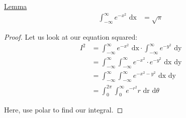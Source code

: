 \documentclass{article}
\begin{document}
\underline{Lemma}
%
\begin{align}
  \int^\infty_{-\infty} e^{-x^2} \text{ dx} & = \sqrt \pi
\end{align}

\begin{proof}
  Let us look at our equation squared:
  \begin{align}
    I^2 & =
    \int^\infty_{-\infty} e^{-x^2} \text{ dx} \cdot
    \int^\infty_{-\infty} e^{-y^2} \text{ dy}\\
    & = \int^\infty_{-\infty} \int^\infty_{-\infty}
    e^{-x^2} \cdot e^{-y^2} \text{ dx dy}\\
    & =
    \int^\infty_{-\infty} \int^\infty_{-\infty}
    e^{-x^2 - y^2} \text{ dx dy}\\
    & =
    \int^{2 \pi}_{0} \int^\infty_0
    e^{-r^2} r \text{ dr d}\theta
  \end{align}

  Here, use polar to find our integral.
\end{proof}
\end{document}
